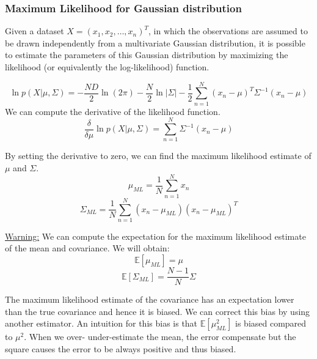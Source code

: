 \subsubsection{Maximum Likelihood for Gaussian distribution}
Given a dataset $X = (x_1, x_2, \dots, x_n)^T$, in which the observations are assumed to be drawn independently from a multivariate Gaussian distribution, it is possible to estimate the parameters of this Gaussian distribution by maximizing the likelihood (or equivalently the log-likelihood) function.

\begin{equation}
    \ln{p(X|\mu, \Sigma)} = -\frac{ND}{2}\ln{(2\pi)}-\frac{N}{2}\ln{|\Sigma|}-\frac{1}{2}\sum_{n=1}^{N} (x_n - \mu)^T \Sigma^{-1} (x_n - \mu)
\end{equation}
We can compute the derivative of the likelihood function.
\begin{equation}
    \frac{\delta}{\delta \mu} \ln{p(X|\mu, \Sigma)} = \sum_{n=1}^{N} \Sigma^{-1} (x_n - \mu)
\end{equation}

By setting the derivative to zero, we can find the maximum likelihood estimate of $\mu$ and $\Sigma$.
\begin{equation}
    \mu_ {ML} = \frac{1}{N}\sum_{n=1}^{N} x_n
\end{equation}
\begin{equation}
    \Sigma_{ML} = \frac{1}{N} \sum_{n=1}^{N} (x_n - \mu_{ML})(x_n - \mu_{ML})^T
\end{equation}

\underline{Warning:} We can compute the expectation for the maximum likelihood estimate of the mean and covariance. We will obtain:
\begin{equation}
    \mathbb{E}[\mu_ {ML}] = \mu
\end{equation}
\begin{equation}
    \mathbb{E}[\Sigma_{ML}] = \frac{N-1}{N}\Sigma
\end{equation}

The maximum likelihood estimate of the covariance has an expectation lower than the true covariance and hence it is biased. We can correct this bias by using another estimator.
An intuition for this bias is that $\mathbb{E}[\mu_{ML}^2]$ is biased compared to $\mu^2$. When we over- under-estimate the mean, the error compensate but the square causes the error to be always positive and thus biased.

